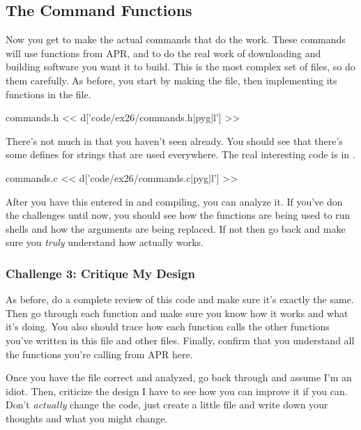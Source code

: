 \subsection{The Command Functions}

Now you get to make the actual commands that do the work.  These commands
will use functions from APR,  and  to do the 
real work of downloading and building software you want it to build.
This is the most complex set of files, so do them carefully.  As before, you
start by making the  file, then implementing its functions
in the  file.

\begin{code}{commands.h}
<< d['code/ex26/commands.h|pyg|l'] >>
\end{code}

There's not much in  that you haven't seen already.  You
should see that there's some defines for strings that are used everywhere.
The real interesting code is in .

\begin{code}{commands.c}
<< d['code/ex26/commands.c|pyg|l'] >>
\end{code}

After you have this entered in and compiling, you can analyze it.  If you've
don the challenges until now, you should see how the  functions
are being used to run shells and how the arguments are being replaced.  If
not then go back and make sure you \emph{truly} understand how 
actually works.

\subsubsection{Challenge 3: Critique My Design}

As before, do a complete review of this code and make sure it's exactly
the same.  Then go through each function and make sure you know how it 
works and what it's doing.  You also should trace how each function calls
the other functions you've written in this file and other files.  Finally,
confirm that you understand all the functions you're calling from APR here.

Once you have the file correct and analyzed, go back through and assume
I'm an idiot.  Then, criticize the design I have to see how you can improve
it if you can.  Don't \emph{actually} change the code, just create a little
 file and write down your thoughts and what you might change.


